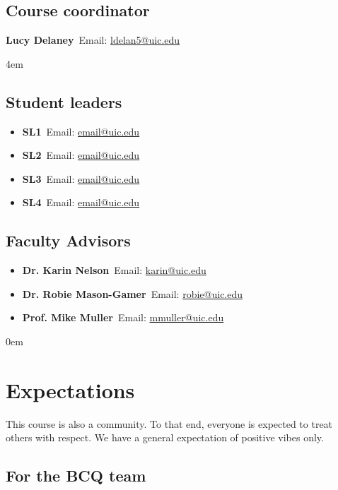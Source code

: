 \documentclass[]{article}
\begin{document}
\subsection{Course coordinator}
\textbf{Lucy Delaney}\ Email: \url{ldelan5@uic.edu}

\leftskip 4em
\begin{multicols}{2}
  

  \subsection{Student leaders}

  \begin{itemize}[label=$\mathwitch*$]
    \item{\textbf{SL1}\ Email: \url{email@uic.edu}}
   \item{\textbf{SL2}\ Email: \url{email@uic.edu}}
  \item{\textbf{SL3}\ Email: \url{email@uic.edu}}
   \item{\textbf{SL4}\ Email: \url{email@uic.edu}}
    \end{itemize}

    \columnbreak

\subsection{Faculty Advisors}
    
    \begin{itemize}[label=$\mathwitch*$]
      \item{\textbf{Dr. Karin Nelson}\ Email: \url{karin@uic.edu}}
      \item{\textbf{Dr. Robie Mason-Gamer}\ Email: \url{robie@uic.edu}}
      \item{\textbf{Prof. Mike Muller}\  Email: \url{mmuller@uic.edu}}
    \end{itemize}

  \end{multicols}   



\leftskip 0em
\section{Expectations}

This course is also a community. To that end, everyone is expected to treat others with respect. We have a general expectation of positive vibes only.

\subsection{For the BCQ team}
\end{document}
